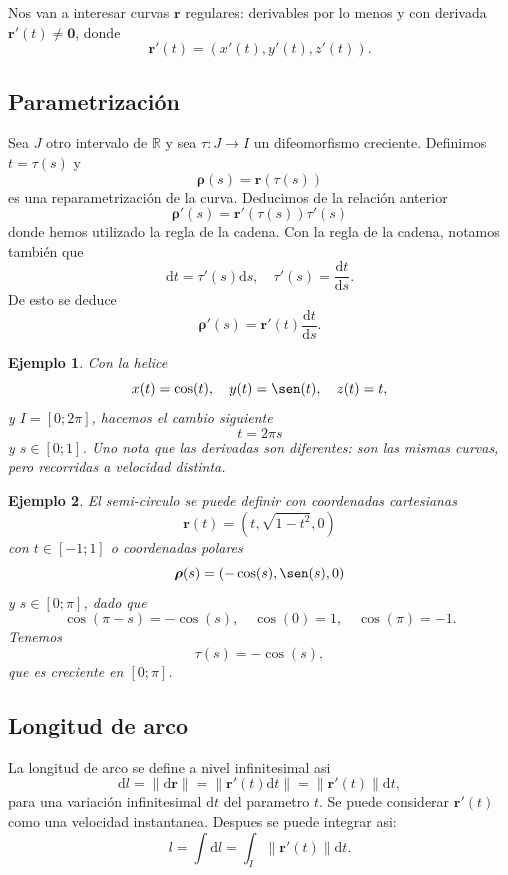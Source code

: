 \documentclass[11pt]{book}
\theoremstyle{definicion}
\theoremstyle{teorema}
\theoremstyle{ejemplo}
\newtheorem{example}{Ejemplo}
\begin{document}
\noindent Nos van a interesar curvas
$\mathbf{r}$ regulares: derivables por lo menos y con derivada
$\mathbf{r}'(t)\neq \mathbf{0}$,
donde \[ \mathbf{r}'(t) = (x'(t), y'(t), z'(t)). \]

\subsection{Parametrizaci\'on}

\noindent
Sea $J$ otro intervalo de $\mathbb{R}$ y sea $\tau:J\rightarrow I$ un difeomorfismo creciente. Definimos
$t=\tau(s)$ y
$$\boldsymbol{\rho}(s)=\mathbf{r}(\tau(s))$$ es una reparametrizaci\'on de la curva. Deducimos de la relaci\'on anterior
$$
\boldsymbol{\rho}'(s)=\mathbf{r}'(\tau(s))\tau'(s)$$
donde hemos utilizado la regla de la cadena.
Con la regla de la cadena, notamos también que
\[
\mathrm{d}t=\tau'(s) \mathrm{d}s, \quad \tau'(s) = \frac{\mathrm{d}t}{\mathrm{d}s}.
\]
De esto se deduce
\[
\boldsymbol{\rho}'(s)=\mathbf{r}'(t) \frac{\mathrm{d}t}{\mathrm{d}s}.
\]
\begin{example}
Con la helice
\[
x(t)=\cos(t), \quad
y(t)=\sen(t), \quad
z(t)=t,
\]
y
$I=[0;2\pi]$, hacemos el cambio siguiente
\[
t = 2\pi s
\]
y $s\in [0;1]$. Uno nota que las derivadas son diferentes: son las mismas curvas, pero recorridas a velocidad distinta.
\end{example}

\begin{example}
El semi-circulo se puede definir con coordenadas cartesianas
\[
\mathbf{r}(t) = ( t , \sqrt{1-t^2} , 0 )
\]
con $t\in [-1;1]$
o coordenadas polares
\[
\boldsymbol{\rho}(s) = ( -\cos(s) , \sen(s) , 0 )
\]
y $s\in [0;\pi]$, dado que
\[
\cos(\pi-s)=-\cos(s), \quad \cos(0)=1, \quad \cos(\pi)=-1.
\]
Tenemos
\[
\tau(s) = -\cos(s),
\]
que es creciente en $[0;\pi]$.
\end{example}

\subsection{Longitud de arco}

\noindent La longitud de arco se define a nivel infinitesimal asi
\[
\mathrm{d}l = 
\| \mathrm{d} \mathbf{r} \|
= 
\| \mathbf{r}'(t) \mathrm{d}t  \|
= 
\| \mathbf{r}'(t)   \| \mathrm{d}t,
\]
para una variaci\'on infinitesimal $\mathrm{d}t$ del parametro $t$. Se puede considerar $\mathbf{r}'(t)$ como una velocidad instantanea. Despues se puede integrar asi:
\[
l = \int \mathrm{d}l = \int_I \| \mathbf{r}'(t)   \| \mathrm{d}t.
\]
\end{document}
